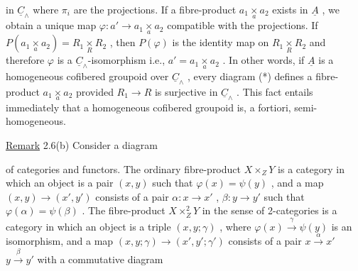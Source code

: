 in  $\underline{C}_\wedge$  where  $\pi_i$  are the projections. If a fibre-product  $a_1 \underset{a}{\times} a_2$  exists in  $\underline{A}$ , we obtain a unique map  $\varphi : a' \to a_1 \underset{a}{\times} a_2$  compatible with the projections. If  $P(a_1 \underset{a}{\times} a_2) = R_1 \underset{R}{\times} R_2$ , then  $P(\varphi)$  is the identity map on  $R_1 \underset{R}{\times} R_2$  and therefore  $\varphi$  is a  $\underline{C}_\wedge$-isomorphism i.e.,  $a' = a_1 \underset{a}{\times} a_2$ . In other words, if  $\underline{A}$  is a homogeneous cofibered groupoid over  $\underline{C}_\wedge$ , every  diagram (*) defines a fibre-product  $a_1 \underset{a}{\times} a_2$  provided  $R_1 \to R$  is surjective in  $\underline{C}_\wedge$ . This fact entails immediately
that a homogeneous cofibered groupoid is, a fortiori, semi-homogeneous.


\underline{Remark} 2.6(b)   Consider a diagram

\begin{center}
\end{center}
of categories and functors. The ordinary fibre-product  $X \times_Z Y$  is a category in which an object is a pair  $(x,y)$  such that  $\varphi(x) = \psi(y)$ , and a map $(x,y) \to (x', y')$  consists of a pair  $\alpha : x \to x'$ , $\beta : y \to y'$  such that $\varphi(\alpha) = \psi(\beta)$ . The fibre-product  $X \times^2_Z Y$  in the sense of  2-categories is a category in which an object is a triple  $(x,y; \gamma)$ , where  $\varphi(x) \xrightarrow{\gamma} \psi(y)$  is an isomorphism, and a map  $(x,y; \gamma) \to (x',y'; \gamma')$  consists of a pair  $x \xrightarrow{\alpha} x'$   $y \xrightarrow{\beta} y'$  with a commutative diagram

